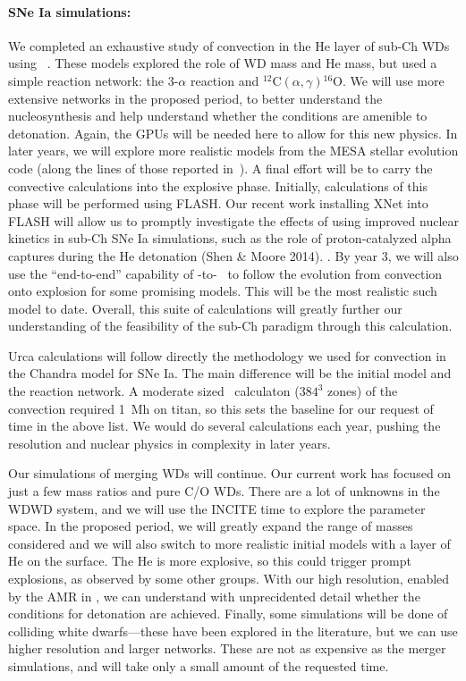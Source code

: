 \paragraph{SNe Ia simulations: }  
%
We completed an exhaustive study of convection in the He layer of
sub-Ch WDs using \maestro~\cite{jacobs:2016}.  These models explored
the role of WD mass and He mass, but used a simple reaction network:
the 3-$\alpha$ reaction and $^{12}\mathrm{C}
(\alpha,\gamma){}^{16}\mathrm{O}$.  We will use more extensive
networks in the proposed period, to better understand the
nucleosynthesis and help understand whether the conditions are
amenible to detonation.  Again, the GPUs will be needed here to allow
for this new physics.  In later years, we will explore more realistic
models from the MESA stellar evolution code (along the lines of those
reported in~\cite{brooks:2015}).  A final effort will be to carry the
convective calculations into the explosive phase. Initially, calculations
of this phase will be performed using FLASH. Our recent work installing 
XNet into FLASH will allow us to promptly investigate the effects of 
using improved nuclear kinetics in sub-Ch SNe Ia simulations, such as 
the role of proton-catalyzed alpha captures during the He detonation 
(Shen \& Moore 2014). \flash{}.  By year 3, we will also use the ``end-to-end'' capability
of \maestro-to-\castro~\cite{Mal14} to follow the evolution from
convection onto explosion for some promising models.  This will be the
most realistic such model to date.  Overall, this suite of
calculations will greatly further our understanding of the feasibility
of the sub-Ch paradigm through this calculation.

Urca calculations will follow directly the methodology we used for
convection in the Chandra model for SNe Ia.  The main difference will
be the initial model and the reaction network.  A moderate sized
\maestro\ calculaton ($384^3$ zones) of the convection required 1~Mh
on titan, so this sets the baseline for our request of time in the
above list.  We would do several calculations each year, pushing the
resolution and nuclear physics in complexity in later years.

Our simulations of merging WDs will continue.  Our current work has
focused on just a few mass ratios and pure C/O WDs.  There are a lot
of unknowns in the WDWD system, and we will use the INCITE time to
explore the parameter space.  In the proposed period, we will greatly
expand the range of masses considered and we will also switch to more
realistic initial models with a layer of He on the surface.  The He is
more explosive, so this could trigger prompt explosions, as observed
by some other groups.  With our high resolution, enabled by the AMR in
\castro, we can understand with unprecidented detail whether the
conditions for detonation are achieved.  
Finally, some simulations will be done of colliding white
dwarfs---these have been explored in the literature, but we can use
higher resolution and larger networks.  These are not as expensive as
the merger simulations, and will take only a small amount of the
requested time.


